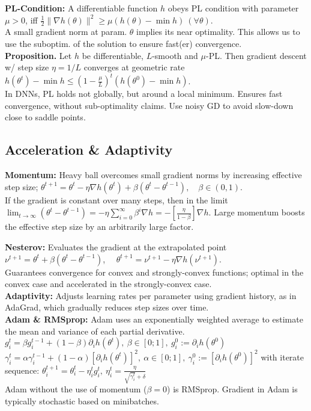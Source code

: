 \textbf{PL-Condition:} A differentiable function $h$ obeys PL condition with parameter $\mu > 0$, iff $\frac{1}{2} \lVert \nabla h(\theta) \rVert^{2} \geq \mu (h(\theta) - \min h) \ (\forall \theta)$. \\
A small gradient norm at param. $\theta$ implies its near optimality. This allows us to use the suboptim. of the solution to ensure fast(er) convergence. \\
\textbf{Proposition.} Let $h$ be differentiable, $L$-smooth and $\mu$-PL. Then gradient descent w/ step size $\eta=1/L$ converges at geometric rate \\
$h(\theta^{t}) - \min h \leq \left( 1 - \frac{\mu}{L} \right)^{t} (h(\theta^{0}) - \min h)$. \\
In DNNs, PL holds not globally, but around a local minimum. Ensures fast convergence, without sub-optimality claims.
Use noisy GD to avoid slow-down close to saddle points.

\subsection{Acceleration \& Adaptivity}
\textbf{Momentum:} Heavy ball overcomes small gradient norms by increasing effective step size;
$\theta^{t+1} = \theta^t - \eta \nabla h(\theta^t) + \beta (\theta^t - \theta^{t-1}), \quad \beta \in (0, 1).$ \\
If the gradient is constant over many steps, then in the limit \\
$\lim_{t \to \infty} (\theta^t - \theta^{t-1}) = - \eta \sum_{i=0}^{\infty} \beta^i \nabla h = - \left[ \frac{\eta}{1 - \beta} \right] \nabla h.$ Large momentum boosts the effective step size by an arbitrarily large factor.

\textbf{Nesterov:} Evaluates the gradient at the extrapolated point\\
$\nu^{t+1} = \theta^{t} + \beta (\theta^{t} - \theta^{t-1})$, \ \ 
$\theta^{t+1} = \nu^{t+1} - \eta \nabla h (\nu^{t+1})$. \\
Guarantees convergence for convex
and strongly-convex functions; optimal in the convex case and accelerated in the strongly-convex case.\\
\textbf{Adaptivity:} Adjusts learning rates per parameter using gradient history, as in AdaGrad, which gradually reduces step sizes over time.\\
\textbf{ Adam \& RMSprop:} Adam uses an exponentially
 weighted average to estimate the mean and variance of each partial derivative. \\
 $g_{i}^{t} = \beta g_{i}^{t-1} + \left(1-\beta \right) \partial_{i} h(\theta^{t}), \ \beta \in [0; 1], \ g_{i}^{0} := \partial_{i}h(\theta^{0})$ \\
  $\gamma_{i}^{t} = \alpha \gamma_{i}^{t-1} + \left(1-\alpha \right) [\partial_{i} h(\theta^{t})]^2, \ \alpha \in [0; 1], \ \gamma_{i}^{0} := [\partial_{i}h(\theta^{0})]^2$ with iterate sequence:
 $\theta_{i}^{t+1} = \theta_{i}^{t} - \eta_{i}^{t} g_{i}^{t}, \ \eta_{i}^{t} = \frac{\eta}{\sqrt{\gamma_{i}^{t}}+\delta}$ \\
 Adam without the use of momentum ($\beta =0$) is RMSprop. Gradient in Adam is typically stochastic based on minibatches.
